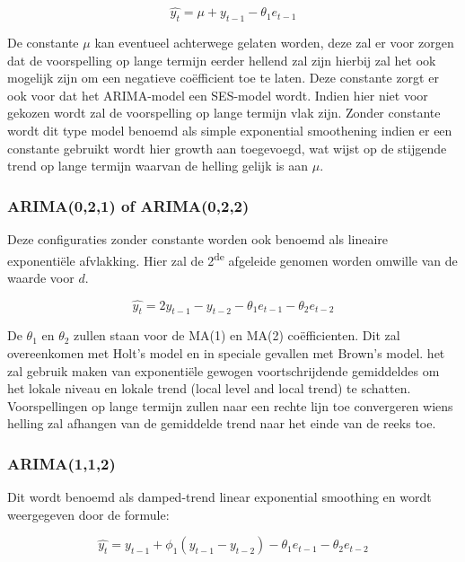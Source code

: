 \begin{equation}
\hat{y_t} = \mu + y_{t-1} - \theta_1 e_{t-1}
\end{equation}

De constante $\mu$ kan eventueel achterwege gelaten worden, deze zal er voor zorgen dat de voorspelling op lange termijn eerder hellend zal zijn hierbij zal het ook mogelijk zijn om een negatieve co\"{e}fficient toe te laten. Deze constante zorgt er ook voor dat het ARIMA-model een SES-model wordt. Indien hier niet voor gekozen wordt zal de voorspelling op lange termijn vlak zijn. Zonder constante wordt dit type model benoemd als simple exponential smoothening indien er een constante gebruikt wordt hier growth aan toegevoegd, wat wijst op de stijgende trend op lange termijn waarvan de helling gelijk is aan $\mu$.

\subsubsection{ARIMA(0,2,1) of ARIMA(0,2,2)}

Deze configuraties zonder constante worden ook benoemd als lineaire exponenti\"{e}le afvlakking. Hier zal de 2\textsuperscript{de} afgeleide genomen worden omwille van de waarde voor $d$. 

\begin{equation}
\hat{y_t} = 2y_{t-1} - y_{t-2} - \theta_1 e_{t-1} - \theta_2 e_{t-2}
\end{equation}

De $\theta_1$ en $\theta_2$ zullen staan voor de MA(1) en MA(2) co\"{e}fficienten. Dit zal overeenkomen met Holt's model en in speciale gevallen met Brown's model. het zal gebruik maken van exponenti\"{e}le gewogen voortschrijdende gemiddeldes om het lokale niveau en lokale trend (local level and local trend) te schatten. Voorspellingen op lange termijn zullen naar een rechte lijn toe convergeren wiens helling zal afhangen van de gemiddelde trend naar het einde van de reeks toe. 

\subsubsection{ARIMA(1,1,2)}

Dit wordt benoemd als damped-trend linear exponential smoothing en wordt weergegeven door de formule:

\begin{equation}
\hat{y_t} = y_{t-1} + \phi_1 (y_{t-1} - y_{t-2}) - \theta_1 e_{t-1} - \theta_2 e_{t-2}
\end{equation}

